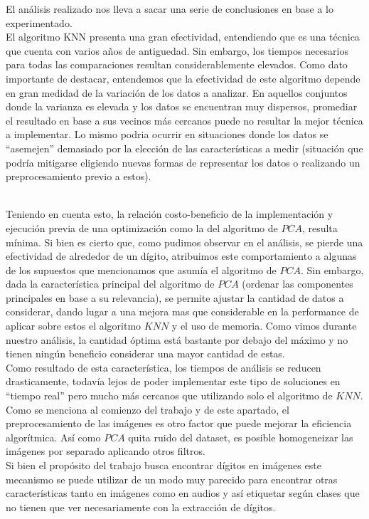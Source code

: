 El análisis realizado nos lleva a sacar una serie de conclusiones en base a lo experimentado.
\\
El algoritmo KNN presenta una gran efectividad, entendiendo que es una técnica que cuenta con varios años de antiguedad. Sin embargo, los tiempos necesarios para todas las comparaciones resultan considerablemente elevados.
Como dato importante de destacar, entendemos que la efectividad de este algoritmo depende en gran medidad de la variación de los datos a analizar. En aquellos conjuntos donde la varianza es elevada y los datos se encuentran muy dispersos, promediar el resultado en base a sus vecinos más cercanos puede no resultar la mejor técnica a implementar. Lo mismo podria ocurrir en situaciones donde los datos se ``asemejen''  demasiado por la elección de las características a medir (situación que podría mitigarse eligiendo nuevas formas de representar los datos o realizando un preprocesamiento previo a estos).

\\
Teniendo en cuenta esto, la relación costo-beneficio de la implementación y ejecución previa de una optimización como la del algoritmo de $PCA$, resulta mínima. Si bien es cierto que, como pudimos observar en el análisis, se pierde una efectividad de alrededor de un dígito, atribuimos este comportamiento a algunas de los supuestos que mencionamos que asumía el algoritmo de $PCA$.
Sin embargo, dada la característica principal del algoritmo de $PCA$ (ordenar las componentes principales en base a su relevancia), se permite ajustar la cantidad de datos a considerar, dando lugar a una mejora mas que considerable en la performance de aplicar sobre estos el algoritmo $KNN$ y el uso de memoria. Como vimos durante nuestro análisis, la cantidad óptima está bastante por debajo del máximo y no tienen ningún beneficio considerar una mayor cantidad de estas.
\\
Como resultado de esta característica, los tiempos de análisis se reducen drasticamente, todavía lejos de poder implementar este tipo de soluciones en ``tiempo real'' pero mucho más cercanos que utilizando solo el algoritmo de $KNN$.
\\
Como se menciona al comienzo del trabajo y de este apartado, el preprocesamiento de las imágenes es otro factor que puede mejorar la eficiencia algorítmica. Así como $PCA$ quita ruido del dataset, es posible homogeneizar las imágenes por separado aplicando otros filtros.
\\
Si bien el propósito del trabajo busca encontrar dígitos en imágenes este mecanismo se puede utilizar de un modo muy parecido para encontrar otras características tanto en imágenes como en audios y así etiquetar según clases que no tienen que ver necesariamente con la extracción de dígitos.
